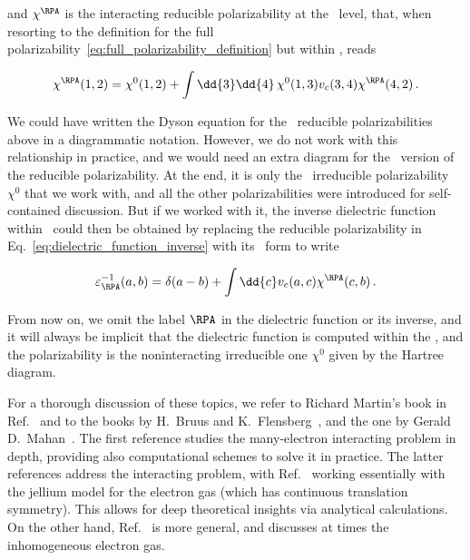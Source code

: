 \noindent and $\chi^{\RPA}$ is the interacting reducible polarizability at the \rpa~level, that, when resorting to the definition for the full polarizability~\eqref{eq:full_polarizability_definition} but within \rpa, reads

\begin{equation}
    \label{eq:Dyson_equation_chi_RPA}
    \chi^\RPA(1,2) = \chi^0(1,2) + \int \dd{3} \dd{4} \, \chi^0(1,3) v_c(3,4) \chi^\RPA(4,2) \,.
\end{equation}

\noindent We could have written the Dyson equation for the \rpa~reducible polarizabilities above in a diagrammatic notation.
However, we do not work with this relationship in practice, and we would need an extra diagram for the \rpa~version of the reducible polarizability.
At the end, it is only the \rpa~irreducible polarizability $\chi^0$ that we work with, and all the other polarizabilities were introduced for self-contained discussion.
But if we worked with it, the inverse dielectric function within \rpa~could then be obtained by replacing the reducible polarizability in Eq.~\eqref{eq:dielectric_function_inverse} with its \rpa~form to write

\begin{equation}
    \label{eq:inverse_dielectric_function_RPA}
    \varepsilon_\RPA^{-1}(a,b) = \delta(a-b) + \int \dd{c} v_c(a,c) \chi^\RPA(c,b) \,.
\end{equation}

\noindent From now on, we omit the label $\RPA$ in the dielectric function or its inverse, and it will always be implicit that the dielectric function is computed within the \rpa, and the polarizability is the noninteracting irreducible one $\chi^0$ given by the Hartree diagram.

For a thorough discussion of these topics, we refer to Richard Martin's book in Ref.~\cite{Martin_Reining_Ceperley_2016} and to the books by H.~Bruus and K.~Flensberg~\cite{Bruus_Flensberg_2004}, and the one by Gerald D.~Mahan~\cite{Mahan}.
The first reference studies the many-electron interacting problem in depth, providing also computational schemes to solve it in practice.
The latter references address the interacting problem, with Ref.~\cite{Bruus_Flensberg_2004} working essentially with the jellium model for the electron gas (which has continuous translation symmetry).
This allows for deep theoretical insights via analytical calculations.
On the other hand, Ref.~\cite{Mahan} is more general, and discusses at times the inhomogeneous electron gas.


